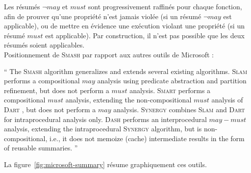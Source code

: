 Les résumés $\lnot may$ et $must$ sont progressivement raffinés pour chaque
fonction, afin de prouver qu'une propriété n'est jamais violée (si un résumé
$\lnot may$ est applicable), ou de mettre en évidence une exécution violant une
propriété (si un résumé $must$ est applicable). Par construction, il n'est pas
possible que les deux résumés soient applicables.\\

Positionnement de \textsc{Smash} \cite{SMASH} par rapport aux autres outils de
Microsoft :
\begin{shaded}
`` The \textsc{Smash} \cite{SMASH} algorithm generalizes and extends several
existing algorithms. \textsc{Slam} \cite{SLAM} performs a compositional $may$
analysis using predicate abstraction and partition refinement, but does not
perform a $must$ analysis. \textsc{Smart} \cite{SMART} performs a compositional
$must$ analysis, extending the non-compositional $must$ analysis of
\textsc{Dart} \cite{DART}, but does not perform a $may$ analysis.
\textsc{Synergy} \cite{SYNERGY} combines \textsc{Slam} \cite{SLAM} and
\textsc{Dart} \cite{DART} for intraprocedural analysis only. \textsc{Dash}
\cite{DASH} performs an interprocedural $may-must$ analysis, extending the
intraprocedural \textsc{Synergy} \cite{SYNERGY} algorithm, but is
non-compositional, i.e., it does not memoize (cache) intermediate results in the
form of reusable summaries. ''
\end{shaded}

La figure~\ref{fig:microsoft-summary} résume graphiquement ces outils.




